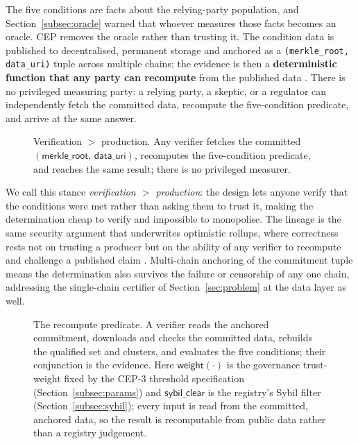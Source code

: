 The five conditions are facts about the relying-party population, and Section~\ref{subsec:oracle} warned that whoever measures those facts becomes an oracle. CEP removes the oracle rather than trusting it. The condition data is published to decentralised, permanent storage and anchored as a \texttt{(merkle\_root, data\_uri)} tuple across multiple chains; the evidence is then a \textbf{deterministic function that any party can recompute} from the published data \cite{ref28_techspec}. There is no privileged measuring party: a relying party, a skeptic, or a regulator can independently fetch the committed data, recompute the five-condition predicate, and arrive at the same answer.

\begin{figure}[tb]
\centering

\caption{Verification $>$ production. Any verifier fetches the committed $(\textsf{merkle\_root},\,\textsf{data\_uri})$, recomputes the five-condition predicate, and reaches the same result; there is no privileged measurer.}
\label{fig:recompute-flow}
\end{figure}

We call this stance \emph{verification $>$ production}: the design lets anyone verify that the conditions were met rather than asking them to trust it, making the determination cheap to verify and impossible to monopolise. The lineage is the same security argument that underwrites optimistic rollups, where correctness rests not on trusting a producer but on the ability of any verifier to recompute and challenge a published claim \cite{ref38_arbitrum}.
Multi-chain anchoring of the commitment tuple means the determination also survives the failure or censorship of any one chain, addressing the single-chain certifier of Section~\ref{sec:problem} at the data layer as well.

\begin{figure}[tb]

\caption{The recompute predicate. A verifier reads the anchored commitment, downloads and checks the committed data, rebuilds the qualified set and clusters, and evaluates the five conditions; their conjunction is the evidence. Here $\textsf{weight}(\cdot)$ is the governance trust-weight fixed by the CEP-3 threshold specification (Section~\ref{subsec:params}) and $\textsf{sybil\_clear}$ is the registry's Sybil filter (Section~\ref{subsec:sybil}); every input is read from the committed, anchored data, so the result is recomputable from public data rather than a registry judgement.}
\label{lst:recompute}
\end{figure}

